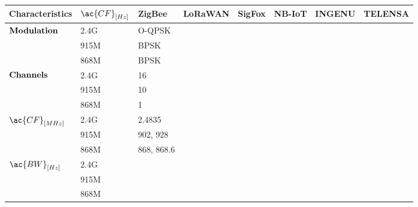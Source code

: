 \begin{longtable}{l|l|l|l|l|l|l|l}
	\bf{Characteristics}               & $\ac{CF}_{[Hz]}$ & \bf{ZigBee}  & \bf{LoRaWAN} & \bf{SigFox} & \bf{NB-IoT} & \textbf{INGENU} & \textbf{TELENSA}\\\hline
	\multirow{3}{*}{$\bf{Modulation}$} & 2.4G             & O-QPSK       &              &             &             &                 &                  \\
	\                                  & 915M             & BPSK         &              &             &             &                 &                 \\
	\                                  & 868M             & BPSK         &              &             &             &                 &                 \\\hline
	\multirow{3}{*}{$\bf{Channels}$}   & 2.4G             & 16           &              &             &             &                 &                 \\
	\                                  & 915M             & 10           &              &             &             &                 &                 \\
	\                                  & 868M             & 1            &              &             &             &                 &                 \\\hline
	\multirow{2}{*}{$\ac{CF}_{[MHz]}$} & 2.4G             & 2.4835       &              &             &             &                 &                 \\
	\                                  & 915M             & 902, 928     &              &             &             &                 &                 \\
	\                                  & 868M             & 868, 868.6   &              &             &             &                 &                 \\\hline
	\multirow{3}{*}{$\ac{BW}_{[Hz]}$}  & 2.4G             &              &              &             &             &                 &                 \\
	\                                  & 915M             &              &              &             &             &                 &                 \\
	\                                  & 868M             &              &              &             &             &                 &                 \\\hline

\end{longtable}
